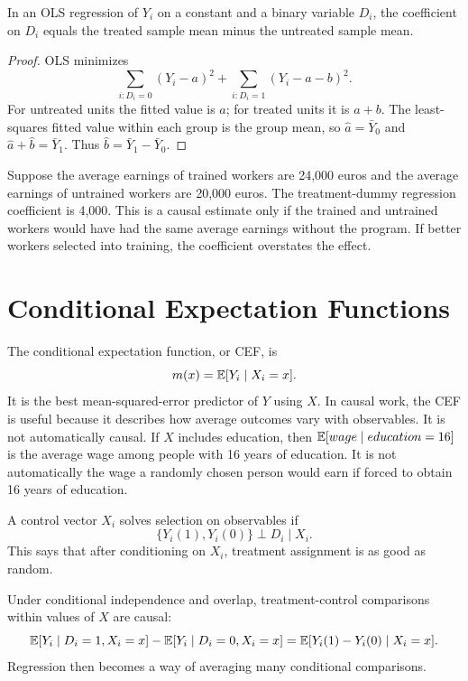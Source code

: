 \begin{thmN}
In an OLS regression of $Y_i$ on a constant and a binary variable $D_i$, the
coefficient on $D_i$ equals the treated sample mean minus the untreated sample
mean.
\end{thmN}

\begin{proof}
OLS minimizes
\[
  \sum_{i:D_i=0}(Y_i-a)^2+\sum_{i:D_i=1}(Y_i-a-b)^2.
\]
For untreated units the fitted value is $a$; for treated units it is $a+b$.
The least-squares fitted value within each group is the group mean, so
$\hat a=\bar Y_0$ and $\hat a+\hat b=\bar Y_1$. Thus
$\hat b=\bar Y_1-\bar Y_0$.
\end{proof}

\begin{exmp}
Suppose the average earnings of trained workers are 24,000 euros and the
average earnings of untrained workers are 20,000 euros. The treatment-dummy
regression coefficient is 4,000. This is a causal estimate only if the trained
and untrained workers would have had the same average earnings without the
program. If better workers selected into training, the coefficient overstates
the effect.
\end{exmp}

\section{Conditional Expectation Functions}

The conditional expectation function, or CEF, is
\[
  m(x)=\mathbb{E}[Y_i\mid X_i=x].
\]
It is the best mean-squared-error predictor of $Y$ using $X$. In causal work,
the CEF is useful because it describes how average outcomes vary with
observables. It is not automatically causal. If $X$ includes education, then
$\mathbb{E}[wage\mid education=16]$ is the average wage among people with 16 years of
education. It is not automatically the wage a randomly chosen person would
earn if forced to obtain 16 years of education.

\begin{defN}
A control vector $X_i$ solves selection on observables if
\[
  \{Y_i(1),Y_i(0)\}\perp D_i \mid X_i.
\]
This says that after conditioning on $X_i$, treatment assignment is as good as
random.
\end{defN}

Under conditional independence and overlap, treatment-control comparisons
within values of $X$ are causal:
\[
  \mathbb{E}[Y_i\mid D_i=1,X_i=x]-\mathbb{E}[Y_i\mid D_i=0,X_i=x]
  =
  \mathbb{E}[Y_i(1)-Y_i(0)\mid X_i=x].
\]
Regression then becomes a way of averaging many conditional comparisons.

